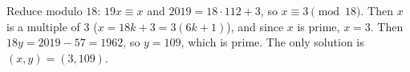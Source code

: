 Reduce modulo $18$: $19x\equiv x$ and $2019=18\cdot112+3$, so $x\equiv3\pmod{18}$. Then $x$ is a multiple of $3$ ($x=18k+3=3(6k+1)$), and since $x$ is prime, $x=3$. Then $18y=2019-57=1962$, so $y=109$, which is prime. The only solution is $\boxed{(x,y)=(3,109)}$.
